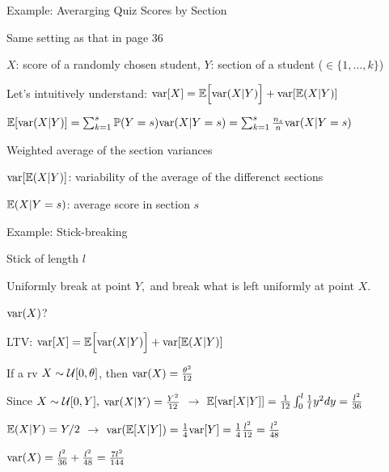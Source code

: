 \begin{frame}{Example: Averarging Quiz Scores by Section}

\plitemsep 0.07in

\bci
\item Same setting as that in page 36

\item $X$: score of a randomly chosen student, $Y$: section of a student ($\in \{1, \ldots, k\}$)

\item<2-> Let's intuitively understand: $\text{var}[ X ] = \mathbb{E}\Bigl[ \text{var}( X|Y ) \Bigr] + \text{var}[ \mathbb{E}( X|Y ) ]$

\item<3-> $\mathbb{E}[ \text{var}( X|Y ) ] = \sum_{k=1}^s \mathbb{P}( Y=s )\text{var}( X | Y=s ) = \sum_{k=1}^s \frac{n_s}{n} \text{var}( X | Y=s )$
\bci
\item Weighted average of the section variances
\item<5-> 
\eci

\item<4-> $\text{var}[ \mathbb{E}( X|Y ) ]$: variability of the average of the differenct sections
\bci
\item $\mathbb{E}( X | Y=s )$: average score in section $s$
\item<5-> 
\eci
\eci


\end{frame}

\begin{frame}{Example: Stick-breaking}

\plitemsep 0.07in

\bci
\item Stick of length $l$
\item Uniformly break at point $Y,$ and break what is left uniformly at point $X.$
\item<2-> \question $\text{var}( X )$?

\item<2-> LTV: $\text{var}[ X ] = \mathbb{E}\Bigl[ \text{var}( X|Y ) \Bigr] + \text{var}[ \mathbb{E}( X|Y ) ]$

\item<3->  If a rv $X \sim \mathcal U[0,\theta]$, then $\text{var}( X ) = \frac{\theta^2}{12}$

\item<4-> Since $X \sim \mathcal U[0,Y],$ $\text{var}( X | Y ) = \frac{Y^2}{12}$ $\rightarrow$ $\mathbb{E}[ \text{var}[ X | Y ] ] = \frac{1}{12} \int_0^l \frac{1}{l} y^2 dy = \frac{l^2}{36}$

\item<5-> $\mathbb{E}( X |Y ) = Y/2$ $\rightarrow$ $\text{var}( \mathbb{E}[ X |Y ] ) = \frac{1}{4} \text{var}[ Y ] = \frac{1}{4} \frac{l^2}{12} = \frac{l^2}{48}$

\item<6-> $\text{var}( X ) = \frac{l^2}{36} + \frac{l^2}{48} = \frac{7l^2}{144}$
\eci


\end{frame}



